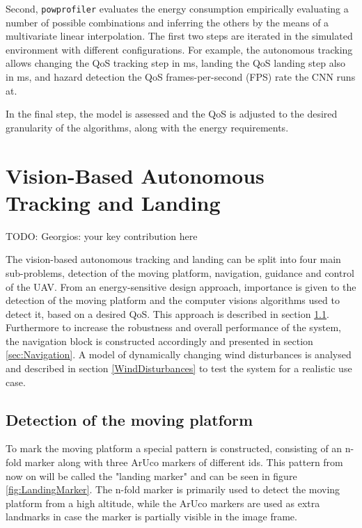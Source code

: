 \documentclass[conference]{IEEEtran}
\newcommand{\stt}[1]{{\small\tt #1}} %
\newcommand{\powprof}{\stt{powprofiler}}
\begin{document}
Second, \powprof{} evaluates the energy consumption empirically evaluating a number of possible combinations and inferring the others by the means of a multivariate linear interpolation. The first two steps are iterated in the simulated environment with different configurations. 
For example, the autonomous tracking allows changing the QoS tracking step in ms, landing the QoS landing step also in ms, and hazard detection the QoS frames-per-second (FPS) rate the CNN runs at.

In the final step, the model is assessed and the QoS is adjusted to the desired granularity of the algorithms, along with the energy requirements.

\section{Vision-Based Autonomous Tracking and Landing}
\label{sec:landing}

TODO: Georgios: your key contribution here

The vision-based autonomous tracking and landing can be split into four main sub-problems, detection of the moving platform, navigation, guidance and control of the UAV. From an energy-sensitive design approach, importance is given to the detection of the moving platform and the computer visions algorithms used to detect it, based on a desired QoS. This approach is described in section \ref{sec:Detection}. Furthermore to increase the robustness and overall performance of the system, the navigation block is constructed accordingly and presented in section \ref{sec:Navigation}. A model of dynamically changing wind disturbances is analysed and described in section \ref{WindDisturbances} to test the system for a realistic use case.


\subsection{Detection of the moving platform}
\label{sec:Detection}
To mark the moving platform a special pattern is constructed, consisting of an n-fold marker \cite{NfoldMarker} along with three ArUco markers \cite{ArUco_marker} of different ids. This pattern from now on will be called the "landing marker" and can be seen in figure \ref{fig:LandingMarker}. The n-fold marker is primarily used to detect the moving platform from a high altitude, while the ArUco markers are used as extra landmarks in case the marker is partially visible in the image frame. 
\end{document}
